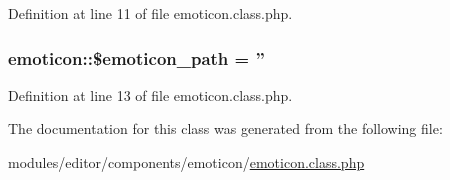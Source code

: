 Definition at line 11 of file emoticon.\+class.\+php.

\hypertarget{classemoticon_a21bb58c0d640141cc27203b584f99dd8}{
\subsubsection[{\$emoticon\+\_\+path}]{\setlength{\rightskip}{0pt plus 5cm}emoticon\+::\$emoticon\+\_\+path = ''}}\label{classemoticon_a21bb58c0d640141cc27203b584f99dd8}


Definition at line 13 of file emoticon.\+class.\+php.



The documentation for this class was generated from the following file\+:\begin{DoxyCompactItemize}
\item 
modules/editor/components/emoticon/\hyperlink{emoticon_8class_8php}{emoticon.\+class.\+php}\end{DoxyCompactItemize}
